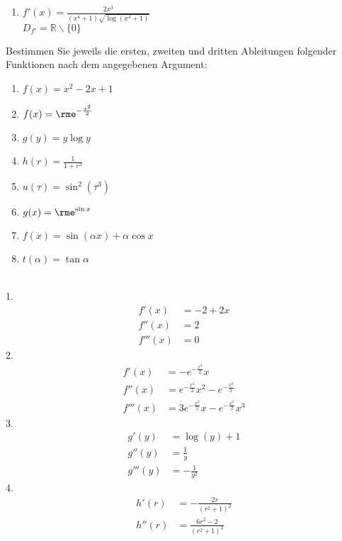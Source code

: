 \documentclass[11pt,answers]{exam}
\begin{document}
\begin{questions}
\begin{solution}
\begin{enumerate}
\item $f'(x)=\frac{2 x^3}{\left(x^4+1\right) \sqrt{\log \left(x^4+1\right)}}$\\ $D_{f'}=\mathbb{R}\backslash\{0\}$
\end{enumerate}
\end{solution}




Bestimmen Sie jeweils die ersten, zweiten und dritten Ableitungen folgender Funktionen nach dem angegebenen Argument:\\
\parbox{0.5\textwidth}{\begin{enumerate}
\item $f(x)=x^2-2x+1$
\item $f(x)=\rme^{-\frac{x^2}{2}}$
\item $g(y)=y\log y$
\item $h(r)=\frac{1}{1+r^2}$
\end{enumerate}}\parbox{0.5\textwidth}{\begin{enumerate}\setcounter{enumi}{4}
\item $u(\tau)=\sin^2(\tau^3) $
\item $g(x)=\rme^{\sin x}$
\item $f(x)=\sin(\alpha x)+\alpha\cos x$
\item $t(\alpha)=\tan\alpha$
\end{enumerate}}
\begin{solution}\\
1.
\begin{align*}
f'(x)&=-2+2x
\\
f''(x)&=2
\\
f'''(x)&=0
\end{align*}
2.
\begin{align*}
f'(x)&=-e^{-\frac{x^2}{2}} x
\\
f''(x)&=e^{-\frac{x^2}{2}} x^2-e^{-\frac{x^2}{2}}
\\
f'''(x)&=3 e^{-\frac{x^2}{2}} x-e^{-\frac{x^2}{2}} x^3
\end{align*}
3.
\begin{align*}
g'(y)&=\log (y)+1
\\
g''(y)&=\frac{1}{y}
\\
g'''(y)&=-\frac{1}{y^2}
\end{align*}
4.
\begin{align*}
h'(r)&=-\frac{2 r}{\left(r^2+1\right)^2}
\\
h''(r)&=\frac{6 r^2-2}{\left(r^2+1\right)^3}
\\

\end{align*}
\end{solution}
\end{questions}
\end{document}
